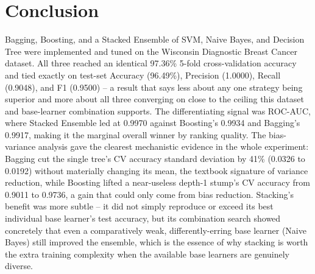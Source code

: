 \documentclass[11pt,a4paper]{article}
\begin{document}
\section{Conclusion}
Bagging, Boosting, and a Stacked Ensemble of SVM, Naive Bayes, and Decision Tree were implemented and tuned on the Wisconsin Diagnostic Breast Cancer dataset. All three reached an identical 97.36\% 5-fold cross-validation accuracy and tied exactly on test-set Accuracy (96.49\%), Precision (1.0000), Recall (0.9048), and F1 (0.9500) -- a result that says less about any one strategy being superior and more about all three converging on close to the ceiling this dataset and base-learner combination supports. The differentiating signal was ROC-AUC, where Stacked Ensemble led at 0.9970 against Boosting's 0.9934 and Bagging's 0.9917, making it the marginal overall winner by ranking quality. The bias-variance analysis gave the clearest mechanistic evidence in the whole experiment: Bagging cut the single tree's CV accuracy standard deviation by 41\% (0.0326 to 0.0192) without materially changing its mean, the textbook signature of variance reduction, while Boosting lifted a near-useless depth-1 stump's CV accuracy from 0.9011 to 0.9736, a gain that could only come from bias reduction. Stacking's benefit was more subtle -- it did not simply reproduce or exceed its best individual base learner's test accuracy, but its combination search showed concretely that even a comparatively weak, differently-erring base learner (Naive Bayes) still improved the ensemble, which is the essence of why stacking is worth the extra training complexity when the available base learners are genuinely diverse.

\end{document}
